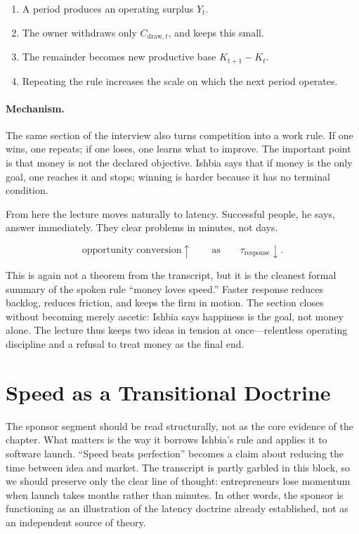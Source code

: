 \begin{enumerate}
\item A period produces an operating surplus \(Y_t\).
\item The owner withdraws only \(C_{\text{draw},t}\), and keeps this small.
\item The remainder becomes new productive base \(K_{t+1} - K_t\).
\item Repeating the rule increases the scale on which the next period operates.
\end{enumerate}

\paragraph{Mechanism.} The same section of the interview also turns competition into a work rule. If one wins, one repeats; if one loses, one learns what to improve. The important point is that money is not the declared objective. Ishbia says that if money is the only goal, one reaches it and stops; winning is harder because it has no terminal condition.

From here the lecture moves naturally to latency. Successful people, he says, answer immediately. They clear problems in minutes, not days.

\begin{equation}
\text{opportunity conversion} \uparrow \qquad \text{as} \qquad \tau_{\text{response}} \downarrow.
\end{equation}

This is again not a theorem from the transcript, but it is the cleanest formal summary of the spoken rule ``money loves speed.'' Faster response reduces backlog, reduces friction, and keeps the firm in motion. The section closes without becoming merely ascetic: Ishbia says happiness is the goal, not money alone. The lecture thus keeps two ideas in tension at once---relentless operating discipline and a refusal to treat money as the final end.

\section{Speed as a Transitional Doctrine}

The sponsor segment should be read structurally, not as the core evidence of the chapter. What matters is the way it borrows Ishbia's rule and applies it to software launch. ``Speed beats perfection'' becomes a claim about reducing the time between idea and market. The transcript is partly garbled in this block, so we should preserve only the clear line of thought: entrepreneurs lose momentum when launch takes months rather than minutes. In other words, the sponsor is functioning as an illustration of the latency doctrine already established, not as an independent source of theory.

